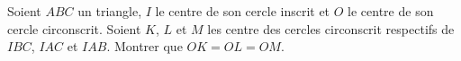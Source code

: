 Soient $ABC$ un triangle, $I$ le centre de son cercle inscrit et $O$ le centre de son cercle circonscrit. Soient $K$, $L$ et $M$ les centre des cercles circonscrit respectifs de $IBC$, $IAC$ et $IAB$. Montrer que $OK = OL = OM$.
